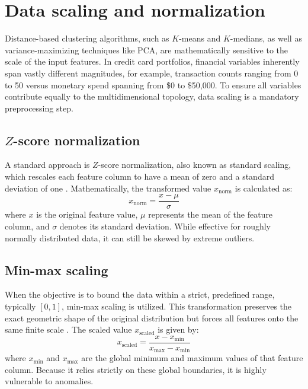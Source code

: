     \section{Data scaling and normalization}
    \label{sec:data_scaling}
    Distance-based clustering algorithms, such as $K$-means and $K$-medians, as well as variance-maximizing techniques like PCA, are mathematically sensitive to the scale of the input features.
    In credit card portfolios, financial variables inherently span vastly different magnitudes, for example, transaction counts ranging from 0 to 50 versus monetary spend spanning from \$0 to \$50,000.
    To ensure all variables contribute equally to the multidimensional topology, data scaling is a mandatory preprocessing step.
    
        \subsection{$Z$-score normalization}
        \label{subsec:zscore_scaling}
        A standard approach is $Z$-score normalization, also known as standard scaling, which rescales each feature column to have a mean of zero and a standard deviation of one \cite{pinheiro_impact_2025}. Mathematically, the transformed value $x_{\text{norm}}$ is calculated as:
        \begin{equation}
            x_{\text{norm}} = \frac{x - \mu}{\sigma}
            \label{eq:zscore}
        \end{equation}
        where $x$ is the original feature value, $\mu$ represents the mean of the feature column, and $\sigma$ denotes its standard deviation. While effective for roughly normally distributed data, it can still be skewed by extreme outliers.
                
        \subsection{Min-max scaling}
        \label{subsec:minmax_scaling}
        When the objective is to bound the data within a strict, predefined range, typically $[0, 1]$, min-max scaling is utilized. This transformation preserves the exact geometric shape of the original distribution but forces all features onto the same finite scale \cite{pinheiro_impact_2025}. The scaled value $x_{\text{scaled}}$ is given by:
        \begin{equation}
            x_{\text{scaled}} = \frac{x - x_{\text{min}}}{x_{\text{max}} - x_{\text{min}}}
            \label{eq:minmax}
        \end{equation}
        where $x_{\text{min}}$ and $x_{\text{max}}$ are the global minimum and maximum values of that feature column. Because it relies strictly on these global boundaries, it is highly vulnerable to anomalies. 
                

